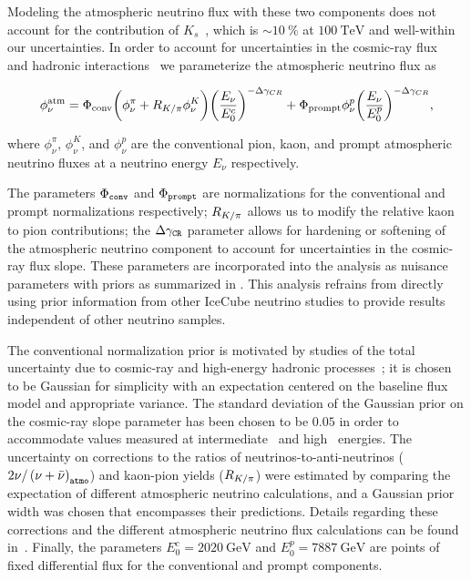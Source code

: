 Modeling the atmospheric neutrino flux with these two components does not account for the contribution of $K_s$~\cite{Gaisser:2014pda}, which is $\sim \SI{10}\percent$ at $\SI{100}\TeV$ and well-within our uncertainties.
In order to account for uncertainties in the cosmic-ray flux~\cite{Dembinski:2017zsh} and hadronic interactions~\cite{Fedynitch:2012fs} we parameterize the atmospheric neutrino flux as
\noindent
\begin{linenomath*}
	\begin{equation}
	\begin{split}
	\phi_\nu^{\rm{atm}} = \Phi_{\rm{conv}} \bigg(\phi^\pi_\nu + R_{K/\pi} \phi^K_\nu\bigg) {\bigg(\frac{E_\nu}{E_0^c} \bigg)}^{-\Delta \gamma_{CR}} + \Phi_{\rm{prompt}} \phi^p_\nu {\bigg(\frac{E_\nu}{E_0^p} \bigg)}^{-\Delta \gamma_{CR}},
	\end{split}
	\label{eq:atm_flux_equation}
	\end{equation}
\end{linenomath*}
where $\phi^\pi_\nu$, $\phi^K_\nu$, and $\phi^p_\nu$ are the conventional pion, kaon, and prompt atmospheric neutrino fluxes at a neutrino energy $E_\nu$ respectively.

The parameters $\Phi_\texttt{conv}$ and $\Phi_\texttt{prompt}$ are normalizations for the conventional and prompt normalizations respectively; $R_{K/\pi}$ allows us to modify the relative kaon to pion contributions; the $\Delta\gamma_\texttt{CR}$ parameter allows for hardening or softening of the atmospheric neutrino component to account for uncertainties in the cosmic-ray flux slope.
These parameters are incorporated into the analysis as nuisance parameters with priors as summarized in .
This analysis refrains from directly using prior information from other IceCube neutrino studies to provide results independent of other neutrino samples.

The conventional normalization prior is motivated by studies of the total uncertainty due to cosmic-ray and high-energy hadronic processes~\cite{Fedynitch:2012fs}; it is chosen to be Gaussian for simplicity with an expectation centered on the baseline flux model and appropriate variance.
The standard deviation of the Gaussian prior on the cosmic-ray slope parameter has been chosen to be $0.05$ in order to accommodate values measured at intermediate~\cite{Karelin:2011zz} and high~\cite{Bartoli:2015fhw,Yoon:2017qjx,Alfaro:2017cwx} energies.
The uncertainty on corrections to the ratios of neutrinos-to-anti-neutrinos (${2\nu/\left(\nu+\bar{\nu}\right)}_\texttt{atmo}$) and kaon-pion yields ($R_{K/\pi}$) were estimated by comparing the expectation of different atmospheric neutrino calculations, and a Gaussian prior width was chosen that encompasses their predictions.
Details regarding these corrections and the different atmospheric neutrino flux calculations can be found in~\cite{CollinFluxes,Jones:2015bya}.
Finally, the parameters $E_0^c=\SI{2020}\GeV$ and $E_0^p=\SI{7887}\GeV$ are points of fixed differential flux for the conventional and prompt components.

